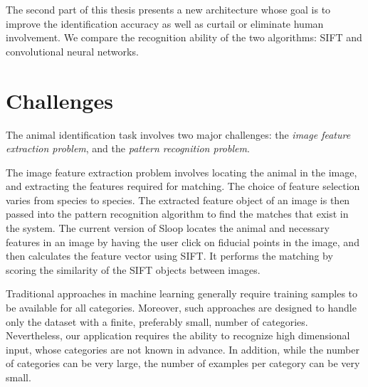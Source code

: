 The second part of this thesis presents a new architecture whose goal is to
improve the identification accuracy as well as curtail or eliminate human
involvement. We compare the recognition ability of the two algorithms: SIFT and
convolutional neural networks.

\section{Challenges}

The animal identification task involves two major challenges: the \emph{image
feature extraction problem}, and the \emph{pattern recognition problem}.

The image feature extraction problem involves locating the animal in the image, and
extracting the features required for matching. The choice of feature selection
varies from species to species. The extracted feature object of an image is then
passed into the pattern recognition algorithm to find the matches that exist in the
system. The current version of Sloop locates the animal and necessary features in an image by
having the user click on fiducial points in the image, and then calculates the
feature vector using SIFT\@. It performs the matching by scoring the similarity of
the SIFT objects between images.

Traditional approaches in machine learning generally require training samples to
be available for all categories. Moreover, such approaches are designed to
handle only the dataset with a finite, preferably small, number of
categories. Nevertheless, our application requires the ability to recognize high
dimensional input, whose categories are not known in advance. In addition, while
the number of categories can be very large, the number of examples per category
can be very small.
